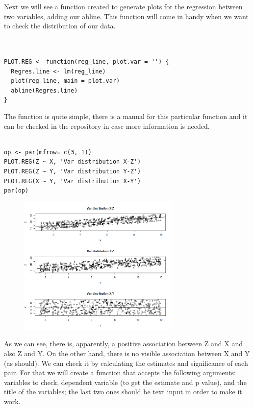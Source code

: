 \documentclass{article}
\begin{document}
Next we will see a function created to generate plots for the regression between two variables, adding our abline. This function will come in handy when we want to check the distribution of our data.


\begin{lstlisting}


PLOT.REG <- function(reg_line, plot.var = '') {
  Regres.line <- lm(reg_line)
  plot(reg_line, main = plot.var)
  abline(Regres.line)
}

\end{lstlisting}

The function is quite simple, there is a manual for this particular function and it can be checked in the repository in case more information is needed.



\begin{lstlisting}

op <- par(mfrow= c(3, 1))
PLOT.REG(Z ~ X, 'Var distribution X-Z')
PLOT.REG(Z ~ Y, 'Var distribution Y-Z')
PLOT.REG(X ~ Y, 'Var distribution X-Y')
par(op)

\end{lstlisting}


\begin{figure}[h]
\includegraphics[width=8cm]{PLOT_CASE1.png}
\centering
\end{figure}
\newpage


As we can see, there is, apparently, a positive association between Z and X and also Z and Y. On the other hand, there is no visible association between X and Y  (as should). We can check it by calculating the estimates and significance of each pair. For that we will create a function that accepts the following  arguments: variables to check, dependent variable (to get the estimate and p value), and the title of the variables; the last two ones should be text input in order to make it work.
\end{document}
